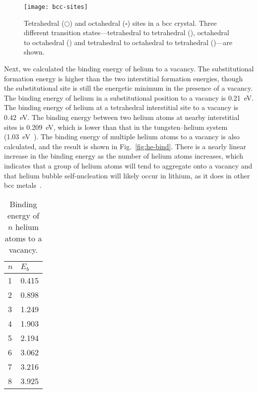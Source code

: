 \begin{figure}
	\centering
  \texttt{[image: bcc-sites]}
  \caption[Tetrahedral ({\scriptsize$\bigcirc$}) and octahedral ($\square$)
    sites in a bcc crystal]{Tetrahedral ({\scriptsize$\bigcirc$}) and octahedral ($\square$)
    sites in a bcc crystal.
    Three different transition states---tetrahedral to tetrahedral
    (), octahedral to octahedral () and tetrahedral to
    octahedral to tetrahedral ()---are shown.}
  \label{fig:tetr}
\end{figure}


Next, we calculated the binding energy of helium to a vacancy.
The substitutional formation energy is higher than the two interstitial
formation energies, though the substitutional site is still the energetic
minimum in the presence of a vacancy.
The binding energy of helium in a substitutional position to a vacancy is
0.21~eV\@.
The binding energy of helium at a tetrahedral interstitial site to a
vacancy is 0.42~eV\@.
The binding energy between two helium atoms at nearby interstitial sites is
0.209~eV, which is lower than that in the tungsten--helium system
(1.03~eV~\cite{Becquart2006}).
The binding energy of multiple helium atoms to a vacancy is also calculated,
and the result is shown in Fig.~\ref{fig:he-bind}. There is a nearly linear
increase in the binding energy as the number of helium atoms increases, which
indicates that a group of helium atoms will tend to aggregate onto a vacancy
and that helium bubble self-nucleation will likely occur in lithium, as it
does in other bcc metals~\cite{Sefta2013b}.


\begin{table}%
  \caption{Binding energy of $n$ helium atoms to a vacancy.}
  \centering
  \begin{tabular}{l l}
  \toprule
    $n$ & $E_b$ \\
  \midrule
    1 & 0.415\\
    2 & 0.898\\
    3 & 1.249\\
    4 & 1.903\\
    5 & 2.194\\
    6 & 3.062\\
    7 & 3.216\\
    8 & 3.925\\
  \bottomrule
  \end{tabular}
\end{table}


